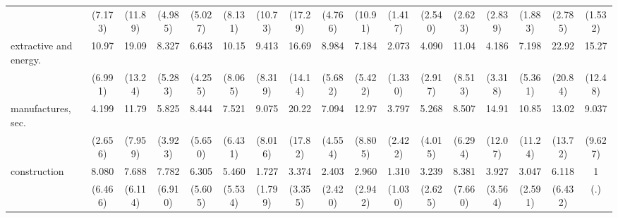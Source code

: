 {\begin{tabular}{l*{16}{c}}
                    &     (7.173)         &     (11.89)         &     (4.985)         &     (5.027)         &     (8.131)         &     (10.73)         &     (17.29)         &     (4.766)         &     (10.91)         &     (1.417)         &     (2.540)         &     (2.623)         &     (2.839)         &     (1.883)         &     (2.785)         &     (1.532)         \\
[1em]
extractive and energy.&       10.97\sym{***}&       19.09\sym{***}&       8.327\sym{***}&       6.643\sym{**} &       10.15\sym{**} &       9.413\sym{*}  &       16.69\sym{***}&       8.984\sym{***}&       7.184\sym{**} &       2.073         &       4.090\sym{*}  &       11.04\sym{**} &       4.186         &       7.198\sym{**} &       22.92\sym{***}&       15.27\sym{***}\\
                    &     (6.991)         &     (13.24)         &     (5.283)         &     (4.255)         &     (8.065)         &     (8.319)         &     (14.14)         &     (5.682)         &     (5.422)         &     (1.330)         &     (2.917)         &     (8.513)         &     (3.318)         &     (5.361)         &     (20.84)         &     (12.48)         \\
[1em]
manufactures, sec.  &       4.199\sym{*}  &       11.79\sym{***}&       5.825\sym{**} &       8.444\sym{**} &       7.521\sym{*}  &       9.075\sym{*}  &       20.22\sym{***}&       7.094\sym{**} &       12.97\sym{***}&       3.797\sym{*}  &       5.268\sym{*}  &       8.507\sym{**} &       14.91\sym{***}&       10.85\sym{*}  &       13.02\sym{*}  &       9.037\sym{*}  \\
                    &     (2.656)         &     (7.959)         &     (3.923)         &     (5.650)         &     (6.431)         &     (8.016)         &     (17.82)         &     (4.554)         &     (8.805)         &     (2.422)         &     (4.015)         &     (6.294)         &     (12.07)         &     (11.24)         &     (13.72)         &     (9.627)         \\
[1em]
construction        &       8.080\sym{**} &       7.688\sym{*}  &       7.782\sym{*}  &       6.305\sym{*}  &       5.460         &       1.727         &       3.374         &       2.403         &       2.960         &       1.310         &       3.239         &       8.381\sym{*}  &       3.927         &       3.047         &       6.118         &           1         \\
                    &     (6.466)         &     (6.114)         &     (6.910)         &     (5.605)         &     (5.534)         &     (1.799)         &     (3.355)         &     (2.420)         &     (2.942)         &     (1.030)         &     (2.625)         &     (7.660)         &     (3.564)         &     (2.591)         &     (6.432)         &         (.)         \\

\end{tabular}}
